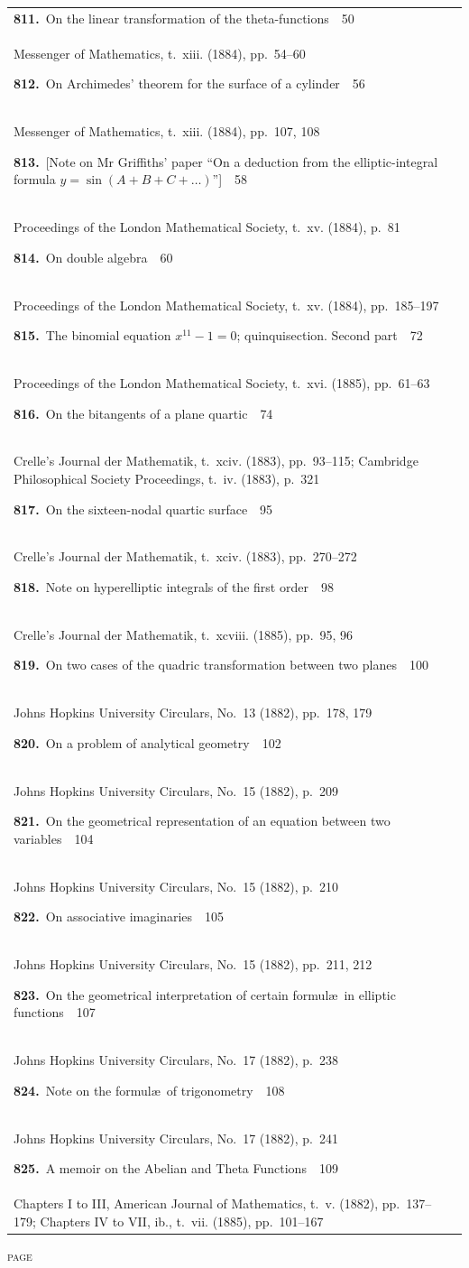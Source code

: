\documentclass[11pt,a4paper]{book}
\newcommand{\paperentry}[4]{%
  \noindent\textbf{#1.}\ {#2}\ \dotfill\ {#3}\\[-0.2em]%
  {\small #4}\par\vspace{0.6em}%
}
\begin{document}
\begin{center}
\begin{tabular}{p{4.2in}r}
\paperentry{811}{On the linear transformation of the theta-functions}{50}{Messenger of Mathematics, t.~xiii. (1884), pp.~54--60}
\paperentry{812}{On Archimedes' theorem for the surface of a cylinder}{56}{Messenger of Mathematics, t.~xiii. (1884), pp.~107, 108}
\paperentry{813}{[Note on Mr Griffiths' paper ``On a deduction from the elliptic-integral formula $y = \sin(A + B + C + \ldots)$'']}{58}{Proceedings of the London Mathematical Society, t.~xv. (1884), p.~81}
\paperentry{814}{On double algebra}{60}{Proceedings of the London Mathematical Society, t.~xv. (1884), pp.~185--197}
\paperentry{815}{The binomial equation $x^{11} - 1 = 0$; quinquisection. Second part}{72}{Proceedings of the London Mathematical Society, t.~xvi. (1885), pp.~61--63}
\paperentry{816}{On the bitangents of a plane quartic}{74}{Crelle's Journal der Mathematik, t.~xciv. (1883), pp.~93--115; Cambridge Philosophical Society Proceedings, t.~iv. (1883), p.~321}
\paperentry{817}{On the sixteen-nodal quartic surface}{95}{Crelle's Journal der Mathematik, t.~xciv. (1883), pp.~270--272}
\paperentry{818}{Note on hyperelliptic integrals of the first order}{98}{Crelle's Journal der Mathematik, t.~xcviii. (1885), pp.~95, 96}
\paperentry{819}{On two cases of the quadric transformation between two planes}{100}{Johns Hopkins University Circulars, No.~13 (1882), pp.~178, 179}
\paperentry{820}{On a problem of analytical geometry}{102}{Johns Hopkins University Circulars, No.~15 (1882), p.~209}
\paperentry{821}{On the geometrical representation of an equation between two variables}{104}{Johns Hopkins University Circulars, No.~15 (1882), p.~210}
\paperentry{822}{On associative imaginaries}{105}{Johns Hopkins University Circulars, No.~15 (1882), pp.~211, 212}
\paperentry{823}{On the geometrical interpretation of certain formul\ae\ in elliptic functions}{107}{Johns Hopkins University Circulars, No.~17 (1882), p.~238}
\paperentry{824}{Note on the formul\ae\ of trigonometry}{108}{Johns Hopkins University Circulars, No.~17 (1882), p.~241}
\paperentry{825}{A memoir on the Abelian and Theta Functions}{109}{Chapters I to III, American Journal of Mathematics, t.~v. (1882), pp.~137--179; Chapters IV to VII, ib., t.~vii. (1885), pp.~101--167}
\end{tabular}
\end{center}

\newpage
\thispagestyle{fancy}
\begin{center}
{\small\textsc{page}}
\end{center}
\vspace{-0.5em}
\end{document}
